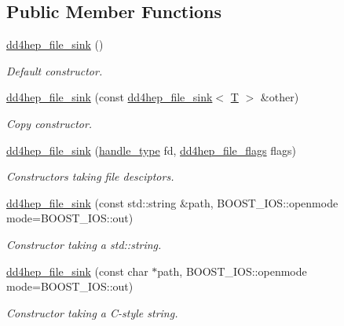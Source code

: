 \subsection*{Public Member Functions}
\begin{DoxyCompactItemize}
\item 
\hyperlink{class_d_d4hep_1_1dd4hep__file__sink_ab8a6a3d1d07d6d0488305e3a961961b2}{dd4hep\+\_\+file\+\_\+sink} ()
\begin{DoxyCompactList}\small\item\em Default constructor. \end{DoxyCompactList}\item 
\hyperlink{class_d_d4hep_1_1dd4hep__file__sink_ac0b723f77cc833f04bbf72fc8a5bada7}{dd4hep\+\_\+file\+\_\+sink} (const \hyperlink{class_d_d4hep_1_1dd4hep__file__sink}{dd4hep\+\_\+file\+\_\+sink}$<$ \hyperlink{class_t}{T} $>$ \&other)
\begin{DoxyCompactList}\small\item\em Copy constructor. \end{DoxyCompactList}\item 
\hyperlink{class_d_d4hep_1_1dd4hep__file__sink_a6dd2a25c79f1bf4d26b8c4475d58b795}{dd4hep\+\_\+file\+\_\+sink} (\hyperlink{class_d_d4hep_1_1dd4hep__file_a4d79f8d433cd7831ff818691424cd6fc}{handle\+\_\+type} fd, \hyperlink{namespace_d_d4hep_a31d19f9b0ce567067d2897fbda1761e5}{dd4hep\+\_\+file\+\_\+flags} flags)
\begin{DoxyCompactList}\small\item\em Constructors taking file desciptors. \end{DoxyCompactList}\item 
\hyperlink{class_d_d4hep_1_1dd4hep__file__sink_a9a5a2c30b5fed19f85593ccc16349e96}{dd4hep\+\_\+file\+\_\+sink} (const std\+::string \&path, B\+O\+O\+S\+T\+\_\+\+I\+O\+S\+::openmode mode=B\+O\+O\+S\+T\+\_\+\+I\+O\+S\+::out)
\begin{DoxyCompactList}\small\item\em Constructor taking a std\+::string. \end{DoxyCompactList}\item 
\hyperlink{class_d_d4hep_1_1dd4hep__file__sink_aae006859555f5fe1ee2d834358476273}{dd4hep\+\_\+file\+\_\+sink} (const char $\ast$path, B\+O\+O\+S\+T\+\_\+\+I\+O\+S\+::openmode mode=B\+O\+O\+S\+T\+\_\+\+I\+O\+S\+::out)
\begin{DoxyCompactList}\small\item\em Constructor taking a C-\/style string. \end{DoxyCompactList}\item 

\end{DoxyCompactItemize}
